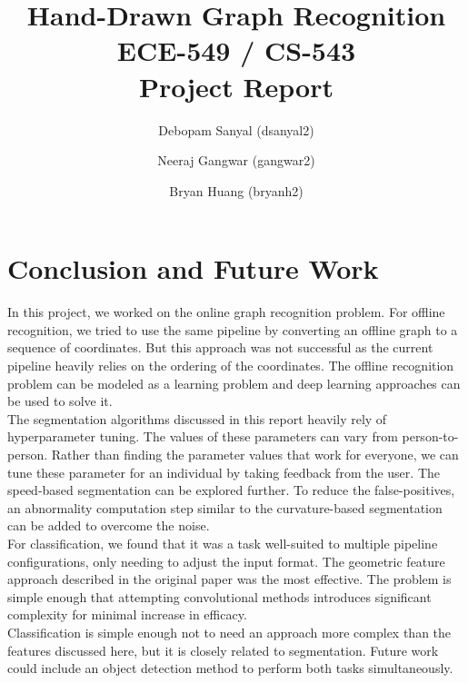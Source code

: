 \documentclass[10pt, twocolumn,letterpaper]{article}
\title{Hand-Drawn Graph Recognition\\
	ECE-549 / CS-543\\
	Project Report}
\author{Debopam Sanyal (dsanyal2) \and Neeraj Gangwar (gangwar2) \and Bryan Huang (bryanh2)}
\begin{document}
	\maketitle
	
	
	
	
	
	
	
	
	
	\section{Conclusion and Future Work}
	In this project, we worked on the online graph recognition problem. For offline recognition, we tried to use the same pipeline by converting an offline graph to a sequence of coordinates. But this approach was not successful as the current pipeline heavily relies on the ordering of the coordinates. The offline recognition problem can be modeled as a learning problem and deep learning approaches can be used to solve it.\\
	
	The segmentation algorithms discussed in this report heavily rely of hyperparameter tuning. The values of these parameters can vary from person-to-person. Rather than finding the parameter values that work for everyone, we can tune these parameter for an individual by taking feedback from the user. The speed-based segmentation can be explored further. To reduce the false-positives, an abnormality computation step similar to the curvature-based segmentation can be added to overcome the noise.\\
	
	For classification, we found that it was a task well-suited to multiple pipeline configurations, only needing to adjust the input format. The geometric feature approach described in the original paper was the most effective. The problem is simple enough that attempting convolutional methods introduces significant complexity for minimal increase in efficacy.\\
    
  Classification is simple enough not to need an approach more complex than the features discussed here, but it is closely related to segmentation. Future work could include an object detection method to perform both tasks simultaneously.\\
\end{document}
